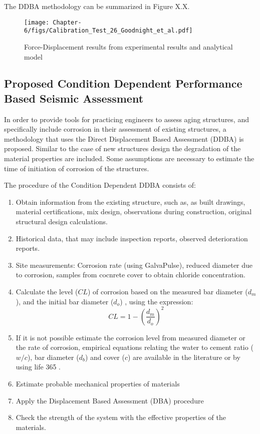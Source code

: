 The DDBA methodology can be summarized in Figure X.X.

\begin{figure}[htbp]
	\centering
	\texttt{[image: Chapter-6/figs/Calibration\_Test\_26\_Goodnight\_et\_al.pdf]}
	\caption{Force-Displacement results from experimental results \cite{Goodnight2013} and analytical model}
	\label{fig:ModelCalibration}
\end{figure}

\subsection{Proposed Condition Dependent Performance Based Seismic Assessment}

In order to provide tools for practicing engineers to assess aging structures, and specifically include corrosion in their assessment of existing structures, a methodology that uses the Direct Displacement Based Assessment (DDBA) is proposed. Similar to the case of new structures design the degradation of the material properties are included. Some assumptions are necessary to estimate the time of initiation of corrosion of the structures.

The procedure of the Condition Dependent DDBA consists of:

\begin{enumerate}
    \item Obtain information from the existing structure, such as, as built drawings, material certifications, mix design, observations during construction, original structural design calculations.
    \item Historical data, that may include inspection reports, observed deterioration reports.
    \item Site measurements: Corrosion rate (using GalvaPulse), reduced diameter due to corrosion, samples from cocnrete cover to obtain chloride concentration.
    \item Calculate the level ($CL$) of corrosion based on the measured bar diameter ($d_{m}$), and the initial bar diameter ($d_o$) , using the expression: 
    \begin{equation}
        CL=1-\left(\frac{d_{m}}{d_{o}}\right)^2
        \label{eq:CL_diameter}
    \end{equation}
    \item If it is not possible estimate the corrosion level from measured diameter or the rate of corrosion, empirical equations relating the water to cement ratio ($w/c$), bar diameter ($d_{b}$) and cover ($c$) are available in the literature \cite{Weyers1994}\cite{Thoft-Christensen} or by using life 365 \cite{Bentz2003}.
    \item Estimate probable mechanical properties of materials
    \item Apply the Displacement Based Assessment (DBA) procedure
    \item Check the strength of the system with the effective properties of the materials.
\end{enumerate}

